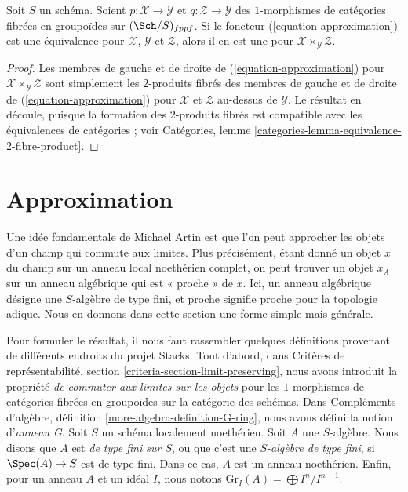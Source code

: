 \begin{lemma}
\label{lemma-fibre-product-effective}
Soit $S$ un schéma. Soient $p : \mathcal{X} \to \mathcal{Y}$ et
$q : \mathcal{Z} \to \mathcal{Y}$ des $1$-morphismes de catégories fibrées
en groupoïdes sur $(\Sch/S)_{fppf}$. Si le foncteur
(\ref{equation-approximation}) est une équivalence pour
$\mathcal{X}$, $\mathcal{Y}$ et $\mathcal{Z}$, alors il en est une pour
$\mathcal{X} \times_\mathcal{Y} \mathcal{Z}$.
\end{lemma}

\begin{proof}
Les membres de gauche et de droite de (\ref{equation-approximation}) pour
$\mathcal{X} \times_\mathcal{Y} \mathcal{Z}$ sont simplement les
$2$-produits fibrés des membres de gauche et de droite de
(\ref{equation-approximation}) pour $\mathcal{X}$ et $\mathcal{Z}$ au-dessus
de $\mathcal{Y}$. Le résultat en découle, puisque la formation des
$2$-produits fibrés est compatible avec les équivalences de catégories ; voir
Catégories, lemme \ref{categories-lemma-equivalence-2-fibre-product}.
\end{proof}






\section{Approximation}
\label{section-approximation}

\noindent
Une idée fondamentale de Michael Artin est que l'on peut approcher les objets
d'un champ qui commute aux limites. Plus précisément, étant donné un objet
$x$ du champ sur un anneau local noethérien complet, on peut trouver un objet
$x_A$ sur un anneau algébrique qui est « proche » de $x$. Ici, un anneau
algébrique désigne une $S$-algèbre de type fini, et proche signifie proche pour
la topologie adique. Nous en donnons dans cette section une forme simple mais
générale.

\medskip\noindent
Pour formuler le résultat, il nous faut rassembler quelques définitions
provenant de différents endroits du projet Stacks. Tout d'abord, dans
Critères de représentabilité, section
\ref{criteria-section-limit-preserving}, nous avons introduit la propriété
{\it de commuter aux limites sur les objets} pour les $1$-morphismes de
catégories fibrées en groupoïdes sur la catégorie des schémas. Dans Compléments
d'algèbre, définition \ref{more-algebra-definition-G-ring}, nous avons défini
la notion d'{\it anneau G}. Soit $S$ un schéma localement noethérien. Soit $A$
une $S$-algèbre. Nous disons que $A$ est {\it de type fini sur $S$}, ou que
c'est une {\it $S$-algèbre de type fini}, si $\Spec(A) \to S$ est de type
fini. Dans ce cas, $A$ est un anneau noethérien. Enfin, pour un anneau $A$ et
un idéal $I$, nous notons $\text{Gr}_I(A) = \bigoplus I^n/I^{n + 1}$.

